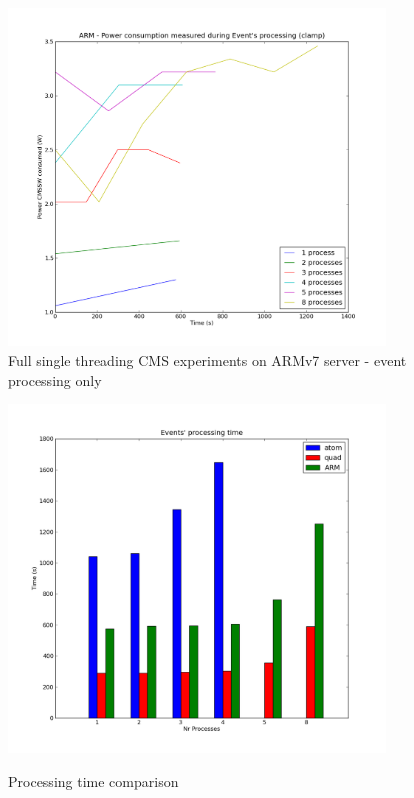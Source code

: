 \begin{figure}[h!]
  \centering
    \includegraphics[width=100mm]{"img/aalto/aalto_armEvents"}
    \caption{Full single threading CMS experiments on ARMv7 server - event
processing only}
    \label{fig:aalto_arm_events}
\end{figure}


\begin{figure}[h!]
  \centering
    \includegraphics[width=100mm]{"img/aalto/aalto_all_time"}
    \label{fig:nf_ss}
    \caption{Processing time comparison}
\end{figure}

